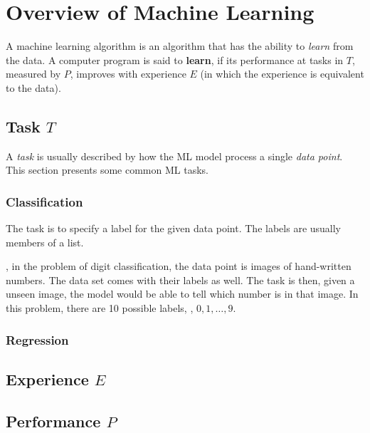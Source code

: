 \chapter{Overview of Machine Learning}

A machine learning algorithm is an algorithm that has the ability to \textit{learn} from the data. A computer program is said to \textbf{learn}, if its performance at tasks in $T$, measured by $P$, improves with experience $E$ (in which the experience is equivalent to the data). \cite{goodfellow2016deep}

\section{Task $T$}
A \textit{task} is usually described by how the \ac{ML} model process a single \textit{data point}. This section presents some common \ac{ML} tasks. \cite{vu2018mlcb}

\subsection{Classification}
The task is to specify a label for the given data point. The labels are usually members of a list.

\Eg, in the problem of digit classification, the data point is images of hand-written numbers. The data set comes with their labels as well. The task is then, given a unseen image, the model would be able to tell which number is in that image. In this problem, there are 10 possible labels, \ie, $0, 1, \dots, 9$.

\subsection{Regression}

\section{Experience $E$}
\section{Performance $P$}

